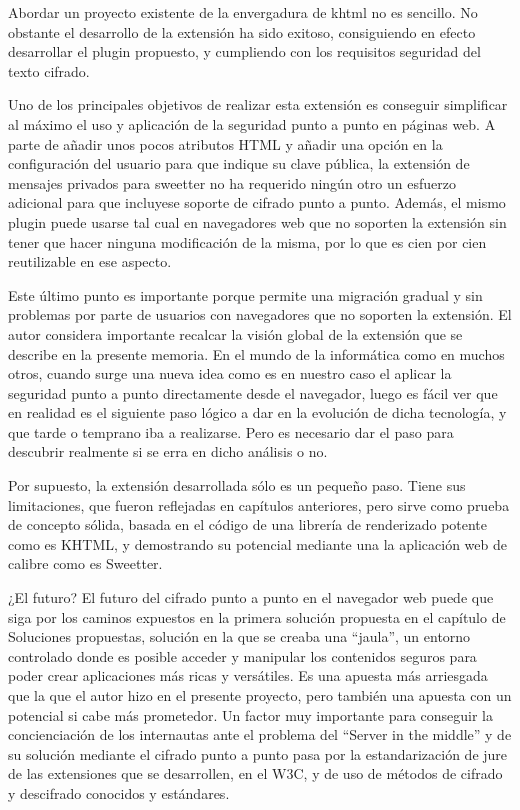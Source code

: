 Abordar un proyecto existente de la envergadura de khtml no es sencillo. No obstante el desarrollo de la extensión ha sido exitoso, consiguiendo en efecto desarrollar el plugin propuesto, y cumpliendo con los requisitos seguridad del texto cifrado. 

Uno de los principales objetivos de realizar esta extensión es conseguir simplificar al máximo el uso y aplicación de la seguridad punto a punto en páginas web. A parte de añadir unos pocos atributos HTML y añadir una opción en la configuración del usuario para que indique su clave pública, la extensión de mensajes privados para sweetter no ha requerido ningún otro un esfuerzo adicional para que incluyese soporte de cifrado punto a punto. Además, el mismo plugin puede usarse tal cual en navegadores web que no soporten la extensión sin tener que hacer ninguna modificación de la misma, por lo que es cien por cien reutilizable en ese aspecto.

Este último punto es importante porque permite una migración gradual y sin problemas por parte de usuarios con navegadores que no soporten la extensión. El autor considera importante recalcar la visión global de la extensión que se describe en la presente memoria. En el mundo de la informática como en muchos otros, cuando surge una nueva idea como es en nuestro caso el aplicar la seguridad punto a punto directamente desde el navegador, luego es fácil ver que en realidad es el siguiente paso lógico a dar en la evolución de dicha tecnología, y que tarde o temprano iba a realizarse. Pero es necesario dar el paso para descubrir realmente si se erra en dicho análisis o no.

Por supuesto, la extensión desarrollada sólo es un pequeño paso. Tiene sus limitaciones, que fueron reflejadas en capítulos anteriores, pero sirve como prueba de concepto sólida, basada en el código de una librería de renderizado potente como es KHTML, y demostrando su potencial mediante una la aplicación web de calibre como es Sweetter. 

¿El futuro? El futuro del cifrado punto a punto en el navegador web puede que siga por los caminos expuestos en la primera solución propuesta en el capítulo de Soluciones propuestas, solución en la que se creaba una ``jaula'', un entorno controlado donde es posible acceder y manipular los contenidos seguros para poder crear aplicaciones más ricas y versátiles. Es una apuesta más arriesgada que la que el autor hizo en el presente proyecto, pero también una apuesta con un potencial si cabe más prometedor. Un factor muy importante para conseguir la concienciación de los internautas ante el problema del ``Server in the middle'' y de su solución mediante el cifrado punto a punto pasa por la estandarización de jure de las extensiones que se desarrollen, en el W3C, y de uso de métodos de cifrado y descifrado conocidos y estándares.
